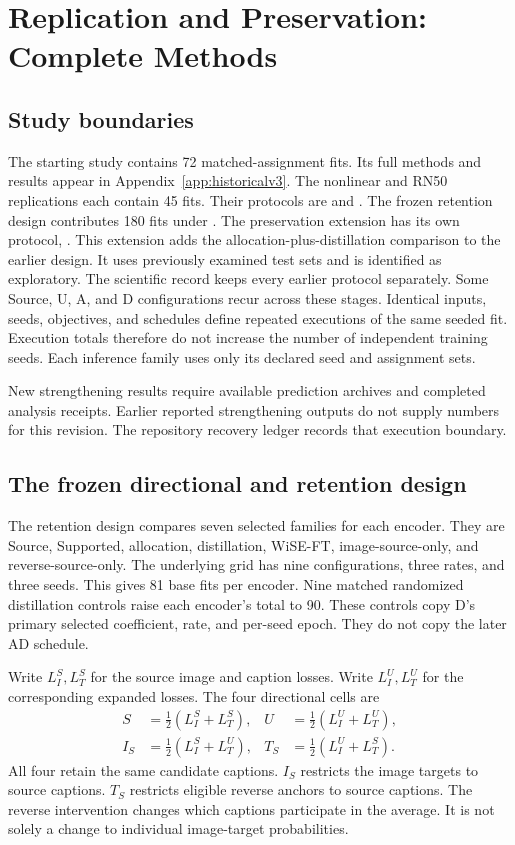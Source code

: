 \section{Replication and Preservation: Complete Methods}
\label{app:newmethods}
\subsection{Study boundaries}
The starting study contains 72 matched-assignment fits.
Its full methods and results appear in Appendix~\ref{app:historicalv3}.
The nonlinear and RN50 replications each contain 45 fits.
Their protocols are  and .
The frozen retention design contributes 180 fits under .
The preservation extension has its own protocol, .
This extension adds the allocation-plus-distillation comparison to the earlier design.
It uses previously examined test sets and is identified as exploratory.
The scientific record keeps every earlier protocol separately.
Some Source, U, A, and D configurations recur across these stages.
Identical inputs, seeds, objectives, and schedules define repeated executions of the same seeded fit.
Execution totals therefore do not increase the number of independent training seeds.
Each inference family uses only its declared seed and assignment sets.

New strengthening results require available prediction archives and completed analysis receipts.
Earlier reported strengthening outputs do not supply numbers for this revision.
The repository recovery ledger records that execution boundary.

\subsection{The frozen directional and retention design}
The retention design compares seven selected families for each encoder.
They are Source, Supported, allocation, distillation, WiSE-FT, image-source-only, and reverse-source-only.
The underlying grid has nine configurations, three rates, and three seeds.
This gives 81 base fits per encoder.
Nine matched randomized distillation controls raise each encoder's total to 90.
These controls copy D's primary selected coefficient, rate, and per-seed epoch.
They do not copy the later AD schedule.

Write $L_I^S,L_T^S$ for the source image and caption losses.
Write $L_I^U,L_T^U$ for the corresponding expanded losses.
The four directional cells are
\begin{align}
S&=\tfrac12(L_I^S+L_T^S),&
U&=\tfrac12(L_I^U+L_T^U),\\
I_S&=\tfrac12(L_I^S+L_T^U),&
T_S&=\tfrac12(L_I^U+L_T^S).
\end{align}
All four retain the same candidate captions.
$I_S$ restricts the image targets to source captions.
$T_S$ restricts eligible reverse anchors to source captions.
The reverse intervention changes which captions participate in the average.
It is not solely a change to individual image-target probabilities.

